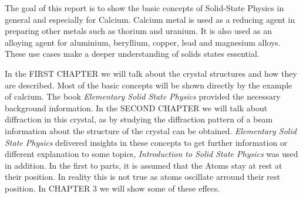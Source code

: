 The goal of this report is to show the basic concepts of Solid-State Physics 
in general and especially for Calcium.
Calcium metal is used as a reducing agent in preparing other metals such as 
thorium and uranium. 
It is also used as an alloying agent for aluminium, beryllium, copper, lead 
and magnesium alloys.
These use cases make a deeper understanding of solids states essential.

In the FIRST CHAPTER we will talk about the crystal structures and how they 
are described.
Most of the basic concepts will be shown directly by the example of calcium. 
The book \textit{Elementary Solid State Physics}
provided the necessary background information. In the SECOND CHAPTER we will 
talk about diffraction in this crystal,
as by studying the diffraction pattern of a beam information about the 
structure of the crystal can be obtained.
\textit{Elementary Solid State Physics} \cite{elementary_SSP} delivered insights in these concepts to get 
further information or different 
explanation to some topics, \textit{Introduction to Solid State Physics} \cite{kittel} was used in addition. 
In the first to parts, it is assumed that the Atoms stay at rest at their
position. In reality this is not true as atoms oscillate arround their
rest position. In CHAPTER 3 we will show some of these effecs.